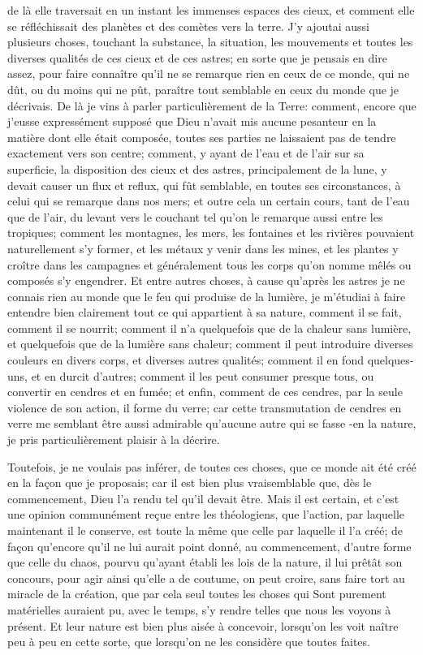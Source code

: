 \documentclass[french,twoside]{book} %
\begin{document}
de là elle traversait en un instant les immenses espaces des cieux, et comment elle se réfléchissait des planètes et des comètes vers la terre. J'y ajoutai aussi plusieurs choses, touchant la substance, la situation, les mouvements et toutes les diverses qualités de ces cieux et de ces astres; en sorte que je pensais en dire assez, pour faire connaître qu'il ne se remarque rien en ceux de ce monde, qui ne dût, ou du moins qui ne pût, paraître tout semblable en ceux du monde que je décrivais. De là je vins à parler particulièrement de la Terre: comment, encore que j'eusse expressément supposé que Dieu n'avait mis aucune pesanteur en la matière dont elle était composée, toutes ses parties ne laissaient pas de tendre exactement vers son centre; comment, y ayant de l'eau et de l'air sur sa superficie, la disposition des cieux et des astres, principalement de la lune, y devait causer un flux et reflux, qui fût semblable, en toutes ses circonstances, à celui qui se remarque dans nos mers; et outre cela un certain cours, tant de l'eau que de l'air, du levant vers le couchant tel qu'on le remarque aussi entre les tropiques; comment les montagnes, les mers, les fontaines et les rivières pouvaient naturellement s'y former, et les métaux y venir dans les mines, et les plantes y croître dans les campagnes et généralement tous les corps qu'on nomme mêlés ou composés s'y engendrer. Et entre autres choses, à cause qu'après les astres je ne connais rien au monde que le feu qui produise de la lumière, je m'étudiai à faire entendre bien clairement tout ce qui appartient à sa nature, comment il se fait, comment il se nourrit; comment il n'a quelquefois que de la chaleur sans lumière, et quelquefois que de la lumière sans chaleur; comment il peut introduire diverses couleurs en divers corps, et diverses autres qualités; comment il en fond quelques-uns, et en durcit d'autres; comment il les peut consumer presque tous, ou convertir en cendres et en fumée; et enfin, comment de ces cendres, par la seule violence de son action, il forme du verre; car cette transmutation de cendres en verre me semblant être aussi admirable qu'aucune autre qui se fasse -en la nature, je pris particulièrement plaisir à la décrire.\par
Toutefois, je ne voulais pas inférer, de toutes ces choses, que ce monde ait été créé en la façon que je proposais; car il est bien plus vraisemblable que, dès le commencement, Dieu l'a rendu tel qu'il devait être. Mais il est certain, et c'est une opinion communément reçue entre les théologiens, que l'action, par laquelle maintenant il le conserve, est toute la même que celle par laquelle il l'a créé; de façon qu'encore qu'il ne lui aurait point donné, au commencement, d'autre forme que celle du chaos, pourvu qu'ayant établi les lois de la nature, il lui prêtât son concours, pour agir ainsi qu'elle a de coutume, on peut croire, sans faire tort au miracle de la création, que par cela seul toutes les choses qui Sont purement matérielles auraient pu, avec le temps, s'y rendre telles que nous les voyons à présent. Et leur nature est bien plus aisée à concevoir, lorsqu'on les voit naître peu à peu en cette sorte, que lorsqu'on ne les considère que toutes faites.\par
\end{document}
